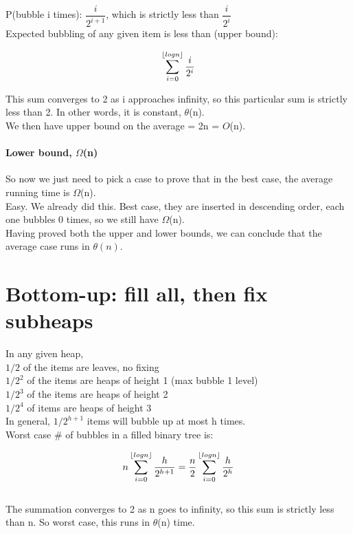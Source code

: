 \documentclass{article}
\DeclarePairedDelimiter{\floor}{\lfloor}{\rfloor}
\begin{document}
P(bubble i times): $\dfrac{i}{2^{i+1}}$, which is strictly less than  $\dfrac{i}{2^{i}}$\\

Expected bubbling of any given item is less than (upper bound):

$$
\sum_{i=0}^{\floor{logn}} \dfrac{i}{2^{i}}
$$

This sum converges to 2 as i approaches infinity, so this particular sum is strictly less than 2. In other words, it is constant, $\theta$(n). \\

We then have upper bound on the average = 2n = $O$(n).

\subsection*{Lower bound, $\Omega$(n)}
So now we just need to pick a case to prove that in the best case, the average running time is $\Omega$(n).\\

Easy. We already did this. Best case, they are inserted in descending order, each one bubbles 0 times, so we still have $\Omega$(n).\\

Having proved both the upper and lower bounds, we can conclude that the average case runs in $\theta(n)$.
\newpage
\part*{Bottom-up: fill all, then fix subheaps}

In any given heap, \\

$1/2$ of the items are leaves, no fixing \\
$1/2^2$ of the items are heaps of height 1 (max bubble 1 level) \\
$1/2^3$ of the items are heaps of height 2 \\
$1/2^4$ of items are heaps of height 3 \\

In general, $1/2^{h+1}$ items will bubble up at most h times. \\

Worst case \# of bubbles in a filled binary tree is:

$$n \sum_{i=0}^{\floor{logn}} \dfrac{h}{2^{h+1}} = 
\dfrac{n}{2} \sum_{i=0}^{\floor{logn}} \dfrac{h}{2^{h}}$$ \\

The summation converges to 2 as n goes to infinity, so this sum is strictly less than n. So worst case, this runs in $\theta$(n) time.
\end{document}
